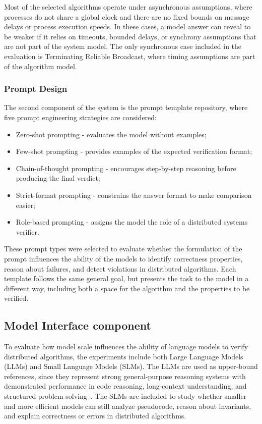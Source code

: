 Most of the selected algorithms operate under asynchronous assumptions, where processes do not share a global clock and there are no fixed bounds on message delays or process execution speeds. In these cases, a model answer can reveal to be weaker if it relies on timeouts, bounded delays, or synchrony assumptions that are not part of the system model. The only synchronous case included in the evaluation is Terminating Reliable Broadcast, where timing assumptions are part of the algorithm model.

\subsubsection{Prompt Design}
The second component of the system is the prompt template repository, where five prompt engineering strategies are considered:

\begin{itemize}
    \item Zero-shot prompting - evaluates the model without examples;
    \item Few-shot prompting - provides examples of the expected verification format;
    \item Chain-of-thought prompting - encourages step-by-step reasoning before producing the final verdict;
    \item Strict-format prompting - constrains the answer format to make comparison easier;
    \item Role-based prompting - assigns the model the role of a distributed systems verifier.
\end{itemize}

These prompt types were selected to evaluate whether the formulation of the prompt influences the ability of the models to identify correctness properties, reason about failures, and detect violations in distributed algorithms. Each template follows the same general goal, but presents the task to the model in a different way, including both a space for the algorithm and the properties to be verified.

\subsection{Model Interface component}
To evaluate how model scale influences the ability of language models to verify distributed algorithms, the experiments include both Large Language Models (LLMs) and Small Language Models (SLMs). The LLMs are used as upper-bound references, since they represent strong general-purpose reasoning systems with demonstrated performance in code reasoning, long-context understanding, and structured problem solving~\cite{zheng2023chatbotarena, liang2022helm}. The SLMs are included to study whether smaller and more efficient models can still analyze pseudocode, reason about invariants, and explain correctness or errors in distributed algorithms.


